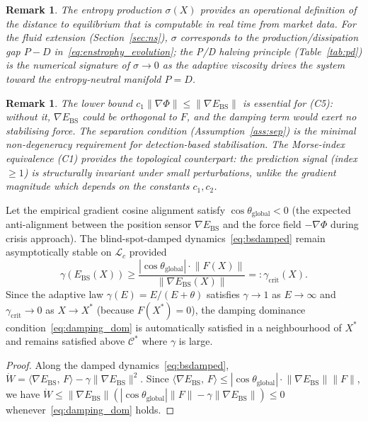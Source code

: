 \documentclass[final]{siamltex}
\newcommand{\norm}[1]{\lVert #1 \rVert}
\newcommand{\inner}[2]{\langle #1,\, #2 \rangle}
\providecommand{\grad}{\nabla}
\newcommand{\Ebs}{E_{\mathrm{BS}}}
\newcommand{\Cman}{\mathcal{C}^*}
\newcommand{\Xst}{X^*}
\newcommand{\costheta}{\cos\theta}
\newtheorem{remark}[theorem]{Remark}
\begin{document}
\begin{remark}\label{rem:entropy_pd}
The entropy production $\sigma(X)$ provides an operational
definition of the distance to equilibrium that is computable in
real time from market data. For the fluid extension
(Section~\ref{sec:ns}), $\sigma$ corresponds to the
production/dissipation gap $P - D$ in~\eqref{eq:enstrophy_evolution};
the P/D halving principle (Table~\ref{tab:pd}) is the numerical
signature of $\sigma \to 0$ as the adaptive viscosity drives the
system toward the entropy-neutral manifold $P = D$.
\end{remark}

\begin{remark}\label{rem:alignment}
The lower bound $c_1\norm{\grad\Phi}\le\norm{\grad\Ebs}$ is
essential for (C5): without it, $\grad\Ebs$ could be orthogonal to
$F$, and the damping term would exert no stabilising force. The
separation condition (Assumption~\ref{ass:sep}) is the minimal
non-degeneracy requirement for detection-based stabilisation.
The Morse-index equivalence (C1) provides the topological
counterpart: the prediction signal (index $\ge 1$) is
structurally invariant under small perturbations, unlike the
gradient magnitude which depends on the constants $c_1, c_2$.
\end{remark}

\begin{proposition}
\label{prop:antialign}
Let the empirical gradient cosine alignment satisfy
$\costheta_{\mathrm{global}} < 0$ (the expected anti-alignment
between the position sensor $\grad\Ebs$ and the force field
$-\grad\Phi$ during crisis approach).
The blind-spot-damped dynamics~\eqref{eq:bsdamped} remain
asymptotically stable on $\mathcal{L}_c$ provided
\begin{equation}\label{eq:damping_dom}
  \gamma(\Ebs(X)) \ge
  \frac{|\costheta_{\mathrm{global}}|\cdot\norm{F(X)}}{\norm{\grad\Ebs(X)}}
  =: \gamma_{\mathrm{crit}}(X).
\end{equation}
Since the adaptive law $\gamma(E) = E/(E + \theta)$ satisfies
$\gamma \to 1$ as $E \to \infty$ and $\gamma_{\mathrm{crit}} \to 0$
as $X \to \Xst$ (because $F(\Xst) = 0$), the damping dominance
condition~\eqref{eq:damping_dom} is automatically satisfied in a
neighbourhood of $\Xst$ and remains satisfied above $\Cman$ where
$\gamma$ is large.
\end{proposition}

\begin{proof}
Along the damped dynamics~\eqref{eq:bsdamped},
$\dot{W} = \inner{\grad\Ebs}{F} - \gamma\norm{\grad\Ebs}^2$.
Since $\inner{\grad\Ebs}{F} \le |\costheta_{\mathrm{global}}|
\cdot \norm{\grad\Ebs}\norm{F}$, we have
$\dot{W} \le \norm{\grad\Ebs}(
|\costheta_{\mathrm{global}}|\norm{F}
- \gamma\norm{\grad\Ebs}) \le 0$
whenever~\eqref{eq:damping_dom} holds.
\end{proof}
\end{document}

